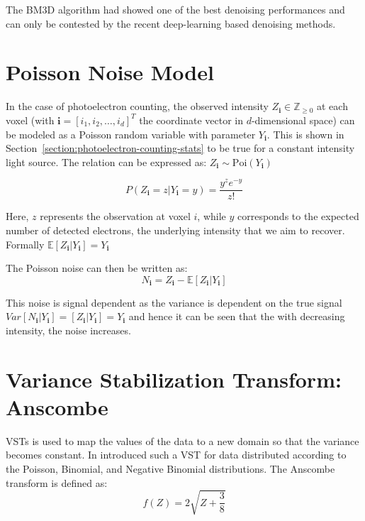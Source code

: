 The \gls{BM3D} algorithm had showed one of the best denoising performances and can only be contested by the recent deep-learning based denoising methods. 

\section{Poisson Noise Model}
In the case of photoelectron counting, the observed intensity $Z_{\mathbf{i}} \in \mathbb{Z}_{\geq 0}$ at each voxel (with $\mathbf{i} = [i_1, i_2, \dots, i_d]^T$ the coordinate vector in $d$-dimensional space) can be modeled as a Poisson random variable with parameter $Y_{\mathbf{i}}$. This is shown in Section~\ref{section:photoelectron-counting-stats} to be true for a constant intensity light source. The relation can be expressed as: $Z_{\mathbf{i}} \sim \text{Poi}(Y_{\mathbf{i}})$

\begin{equation}
    P(Z_{\mathbf{i}} = z| Y_{\mathbf{i}} = y) = \frac{y^z e^{-y}}{z!}
\end{equation}


Here, $z$ represents the observation at voxel $i$, while $y$ corresponds to the expected number of detected electrons, the underlying intensity that we aim to recover. Formally $\mathbb{E}[Z_{\mathbf{i}} | Y_{\mathbf{i}}] = Y_{\mathbf{i}}$

The Poisson noise can then be written as:
\begin{equation}
    N_{\mathbf{i}} = Z_{\mathbf{i}} - \mathbb{E}[Z_{\mathbf{i}} | Y_{\mathbf{i}}]
\end{equation}

This noise is signal dependent as the variance is dependent on the true signal $Var[N_{\mathbf{i}} | Y_{\mathbf{i}}] = [Z_{\mathbf{i}} | Y_{\mathbf{i}}] = Y_{\mathbf{i}}$ and hence it can be seen that the with decreasing intensity, the noise increases.

\section{Variance Stabilization Transform: Anscombe}
\Glspl{VST} is used to map the values of the data to a new domain so that the variance becomes constant. In \cite{anscombeTransformationPoissonBinomial1948} introduced such a \gls{VST} for data distributed according to the Poisson, Binomial, and Negative Binomial distributions. The Anscombe transform is defined as:
\begin{equation}
    f(Z) = 2 \sqrt{Z + \frac{3}{8}}
\end{equation}

